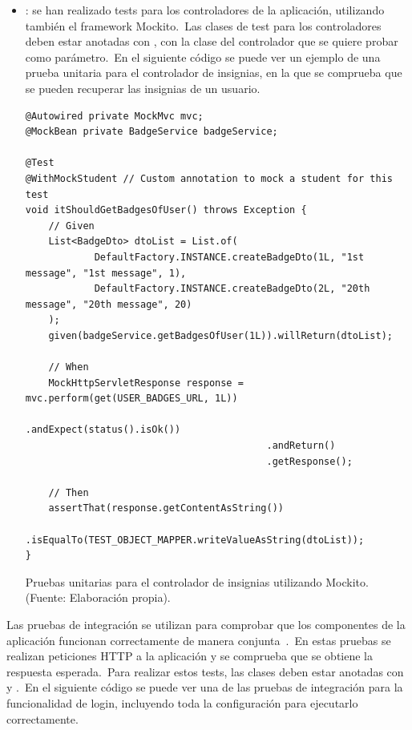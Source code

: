 \begin{itemize}
	\item {}: se han realizado tests para los controladores de la aplicación, utilizando también
	el framework Mockito.\ Las clases de test para los controladores deben estar anotadas con ,
	con la clase del controlador que se quiere probar como parámetro.\ En el siguiente código se puede ver un ejemplo
	de una prueba unitaria para el controlador de insignias, en la que se comprueba que se pueden recuperar las
	insignias de un usuario.
	\begin{codeBlock}
		\begin{verbatim}
@Autowired private MockMvc mvc;
@MockBean private BadgeService badgeService;

@Test
@WithMockStudent // Custom annotation to mock a student for this test
void itShouldGetBadgesOfUser() throws Exception {
	// Given
	List<BadgeDto> dtoList = List.of(
			DefaultFactory.INSTANCE.createBadgeDto(1L, "1st message", "1st message", 1),
			DefaultFactory.INSTANCE.createBadgeDto(2L, "20th message", "20th message", 20)
	);
	given(badgeService.getBadgesOfUser(1L)).willReturn(dtoList);

	// When
	MockHttpServletResponse response = mvc.perform(get(USER_BADGES_URL, 1L))
	                                      .andExpect(status().isOk())
	                                      .andReturn()
	                                      .getResponse();

	// Then
	assertThat(response.getContentAsString())
			.isEqualTo(TEST_OBJECT_MAPPER.writeValueAsString(dtoList));
}
		\end{verbatim}
		\caption{Pruebas unitarias para el controlador de insignias utilizando Mockito. (Fuente: Elaboración propia).}
		\label{code:pruebas-unitarias-controlador}
	\end{codeBlock}

\end{itemize}
\label{itm:pruebas-unitarias-backend}


Las pruebas de integración se utilizan para comprobar que los componentes de la aplicación funcionan correctamente
de manera conjunta~\cite{integration_testing}.\ En estas pruebas se realizan peticiones HTTP a la aplicación y se
comprueba que se obtiene la respuesta esperada.\ Para realizar estos tests, las clases deben estar
anotadas con  y .\ En el siguiente código se puede ver
una de las pruebas de integración para la funcionalidad de login, incluyendo toda la configuración para ejecutarlo
correctamente.

